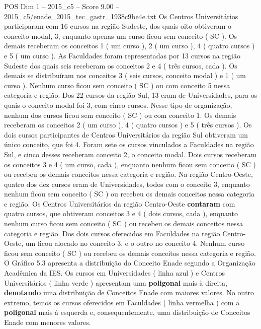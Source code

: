 \begin{textsample}{POS Dim 1 – 2015\_c5 – Score 9.00 – 2015\_c5/enade\_2015\_tec\_gastr\_1938c9be4e.txt}
Os Centros Universitários participaram com 16 cursos na região Sudeste, dos quais oito obtiveram o conceito modal, 3, enquanto apenas um curso ficou sem conceito ( SC ).
Os demais receberam os conceitos 1 ( um curso ), 2 ( um curso ), 4 ( quatro cursos ) e 5 ( um curso ).
As Faculdades foram representadas por 13 cursos na região Sudeste dos quais seis receberam os conceitos 2 e 4 ( três cursos, cada ).
Os demais se distribuíram nos conceitos 3 ( seis cursos, conceito modal ) e 1 ( um curso ).
Nenhum curso ficou sem conceito ( SC ) ou com conceito 5 nessa categoria e região.
Dos 22 cursos da região Sul, 13 eram de Universidades, para os quais o conceito modal foi 3, com cinco cursos.
Nesse tipo de organização, nenhum dos cursos ficou sem conceito ( SC ) ou com conceito 1.
Os demais receberam os conceitos 2 ( um curso ), 4 ( quatro cursos ) e 5 ( três cursos ).
Os dois cursos participantes de Centros Universitários da região Sul obtiveram um único conceito, que foi 4.
Foram sete os cursos vinculados a Faculdades na região Sul, e cinco desses receberam conceito 2, o conceito modal.
Dois cursos receberam os conceitos 3 e 4 ( um curso, cada ), enquanto nenhum ficou sem conceito ( SC ) ou recebeu os demais conceitos nessa categoria e região.
Na região Centro-Oeste, quatro dos dez cursos eram de Universidades, todos com o conceito 3, enquanto nenhum ficou sem conceito ( SC ) ou recebeu os demais conceitos nessa categoria e região.
Os Centros Universitários da região Centro-Oeste \textbf{contaram} com quatro cursos, que obtiveram conceitos 3 e 4 ( dois cursos, cada ), enquanto nenhum curso ficou sem conceito ( SC ) ou recebeu os demais conceitos nessa categoria e região.
Dos dois cursos oferecidos em Faculdades na região Centro-Oeste, um ficou alocado no conceito 3, e o outro no conceito 4.
Nenhum curso ficou sem conceito ( SC ) ou recebeu os demais conceitos nessa categoria e região.
O Gráfico 5.3 apresenta a distribuição do Conceito Enade segundo a Organização Acadêmica da IES.
Os cursos em Universidades ( linha azul ) e Centros Universitários ( linha verde ) apresentam uma \textbf{poligonal} mais à direita, \textbf{denotando} uma distribuição de Conceitos Enade com maiores valores.
No outro extremo, temos os cursos oferecidos em Faculdades ( linha vermelha ) com a \textbf{poligonal} mais à esquerda e, consequentemente, uma distribuição de Conceitos Enade com menores valores.

\end{textsample}
